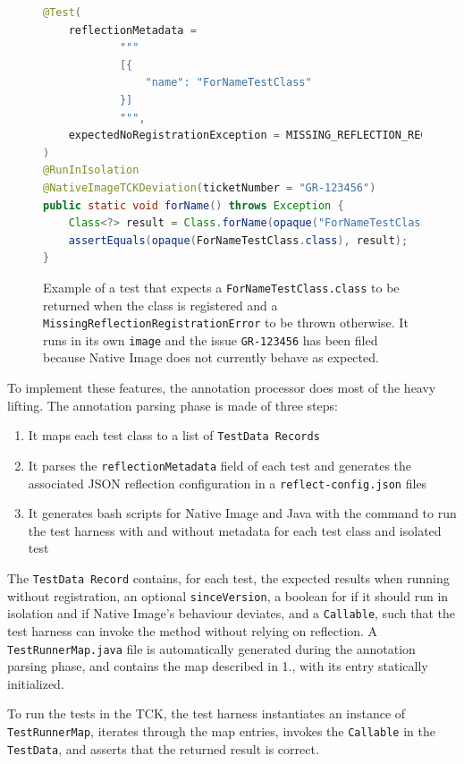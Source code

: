 \begin{figure}[ht]
    \centering
\begin{lstlisting}[language=Java]
@Test(
    reflectionMetadata =
            """
            [{
                "name": "ForNameTestClass"
            }]
            """,
    expectedNoRegistrationException = MISSING_REFLECTION_REGISTRATION_ERROR
)
@RunInIsolation
@NativeImageTCKDeviation(ticketNumber = "GR-123456")
public static void forName() throws Exception {
    Class<?> result = Class.forName(opaque("ForNameTestClass"));
    assertEquals(opaque(ForNameTestClass.class), result);
}
\end{lstlisting}
    \caption{Example of a test that expects a \texttt{ForNameTestClass.class} to be returned when the class is registered and a \texttt{MissingReflectionRegistrationError} to be thrown otherwise. It runs in its own \texttt{image} and the issue \texttt{GR-123456} has been filed because Native Image does not currently behave as expected.}
    \label{fig:tck_for_name}
\end{figure}

To implement these features, the annotation processor does most of the heavy lifting. The annotation parsing phase is made of three steps:
\begin{enumerate}
    \item It maps each test class to a list of \verb|TestData Records| 
    \item It parses the \verb|reflectionMetadata| field of each test and generates the associated JSON reflection configuration in a \verb|reflect-config.json| files
    \item It generates bash scripts for Native Image and Java with the command to run the test harness with and without metadata for each test class and isolated test
\end{enumerate}

The \verb|TestData Record| contains, for each test, the expected results when running without registration, an optional \verb|sinceVersion|, a boolean for if it should run in isolation and if Native Image's behaviour deviates, and a \verb|Callable|, such that the test harness can invoke the method without relying on reflection.  
A \verb|TestRunnerMap.java| file is automatically generated during the annotation parsing phase, and contains the map described in 1., with its entry statically initialized. 

To run the tests in the TCK, the test harness instantiates an instance of \verb|TestRunnerMap|, iterates through the map entries, invokes the \verb|Callable| in the \verb|TestData|, and asserts that the returned result is correct.

